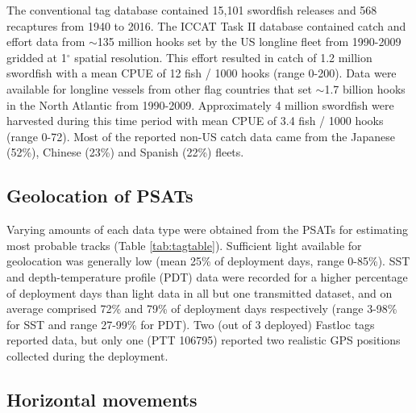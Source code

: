 The conventional tag database contained 15,101 swordfish releases and 568 recaptures from 1940 to 2016. The ICCAT Task II database contained catch and effort data from $\sim$135 million hooks set by the US longline fleet from 1990-2009 gridded at 1$^{\circ}$ spatial resolution. This effort resulted in catch of 1.2 million swordfish with a mean CPUE of 12 fish / 1000 hooks (range 0-200). Data were available for longline vessels from other flag countries that set $\sim$1.7 billion hooks in the North Atlantic from 1990-2009. Approximately 4 million swordfish were harvested during this time period with mean CPUE of 3.4 fish / 1000 hooks (range 0-72). Most of the reported non-US catch data came from the Japanese (52\%), Chinese (23\%) and Spanish (22\%) fleets.

\subsection{Geolocation of PSATs}%

Varying amounts of each data type were obtained from the PSATs for estimating most probable tracks (Table \ref{tab:tagtable}). Sufficient light available for geolocation was generally low (mean 25\% of deployment days, range 0-85\%). SST and depth-temperature profile (PDT) data were recorded for a higher percentage of deployment days than light data in all but one transmitted dataset, and on average comprised 72\% and 79\% of deployment days respectively (range 3-98\% for SST and range 27-99\% for PDT). Two (out of 3 deployed) Fastloc tags reported data, but only one (PTT 106795) reported two realistic GPS positions collected during the deployment.

\subsection{Horizontal movements}%

